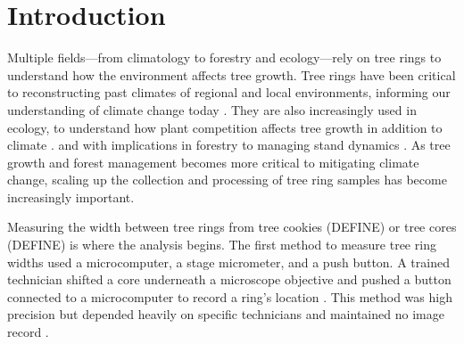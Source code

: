 \documentclass[a4paper,12pt]{article}
\begin{document}
\section{Introduction}
Multiple fields---from climatology to forestry and ecology---rely on tree rings to understand how the environment affects tree growth. Tree rings have been critical to 
reconstructing past climates of regional and local environments, informing our understanding of climate change today \citep{fritts_dendroclimatology_1971} \citep{williams_using_2010} \citep{guibal_dendrochronology_2021} \citep{sheppard_dendroclimatology_2010}. They are also increasingly used in ecology, to understand how plant competition affects tree growth in addition to climate \citep{buechling_climate_2017}.
and with implications in forestry to managing stand dynamics \citep{canham_neighborhood_2004}. 
As tree growth and forest management becomes more critical to mitigating climate change, scaling up the collection and processing of tree ring samples has become increasingly important. 

Measuring the width between tree rings from tree cookies (DEFINE) or tree cores (DEFINE) is where the analysis begins. %
The first method to measure tree ring widths used a microcomputer, a stage micrometer, and a push button. A trained technician shifted a core underneath a microscope objective and pushed a button connected to a microcomputer to record a ring's location \citep{robinson_microcomputer_1980}. 
This method was high precision but depended heavily on specific technicians and maintained no image record \citep{levanic_atrics_2007}. 
\end{document}
